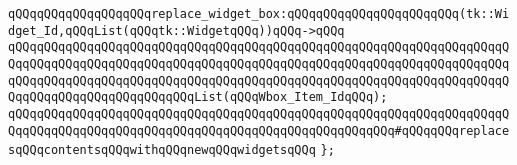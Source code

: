 \newline
\verb|qQQqqQQqqQQqqQQqqQQqreplace_widget_box:qQQqqQQqqQQqqQQqqQQqqQQq(tk::Widget_Id,qQQqList(qQQqtk::WidgetqQQq))qQQq->qQQq|\newline
\verb|qQQqqQQqqQQqqQQqqQQqqQQqqQQqqQQqqQQqqQQqqQQqqQQqqQQqqQQqqQQqqQQqqQQqqQQqqQQqqQQqqQQqqQQqqQQqqQQqqQQqqQQqqQQqqQQqqQQqqQQqqQQqqQQqqQQqqQQqqQQqqQQqqQQqqQQqqQQqqQQqqQQqqQQqqQQqqQQqqQQqqQQqqQQqqQQqqQQqqQQqqQQqqQQqqQQqqQQqqQQqqQQqqQQqqQQqqQQqList(qQQqWbox_Item_IdqQQq);|\newline
\verb|qQQqqQQqqQQqqQQqqQQqqQQqqQQqqQQqqQQqqQQqqQQqqQQqqQQqqQQqqQQqqQQqqQQqqQQqqQQqqQQqqQQqqQQqqQQqqQQqqQQqqQQqqQQqqQQqqQQqqQQqqQQq#qQQqqQQqreplacesqQQqcontentsqQQqwithqQQqnewqQQqwidgetsqQQq|\newline
\verb|};|\newline

